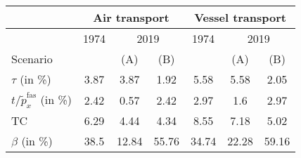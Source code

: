 \begin{tabular}{l|c|cc||c|cc}
\hline \hline
& \multicolumn{3}{|c||}{Air transport} & \multicolumn{3}{|c}{Vessel transport} \\ \hline
& 1974 & \multicolumn{2}{|c||}{2019} & 1974 & \multicolumn{2}{|c}{2019}\\ \cline{2-7}
Scenario &  & (A) &  (B) &  & (A) & (B) \\ \hline
$\tau$ (in \%) & 3.87 & 3.87 & 1.92 & 5.58 & 5.58 & 2.05\\
$t/\widetilde{p}^{\text{fas}}_x$ (in \%) & 2.42 & 0.57 & 2.42 & 2.97 & 1.6 & 2.97 \\
TC & 6.29 & 4.44 & 4.34 & 8.55 & 7.18 & 5.02 \\
$\beta$ (in \%) & 38.5 & 12.84 & 55.76 & 34.74 & 22.28 &59.16 \\
\hline \hline
\end{tabular} 
